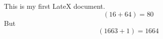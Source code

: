 \documentclass[11pt]{article}
\begin{document}
	This is my first LateX document.
	$$(16 + 64) = 80$$
	But
	$$(1663 + 1) = 1664$$
\end{document}
